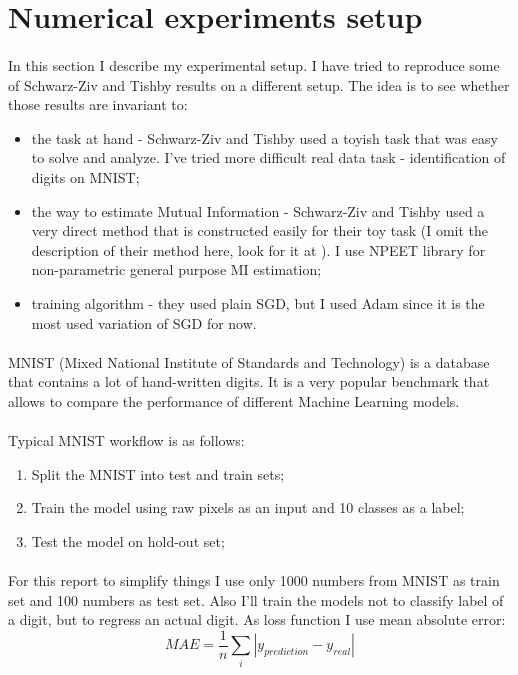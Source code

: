 \documentclass[a4paper,14pt]{extarticle}
\begin{document}
\section{Numerical experiments setup}
\paragraph{}
In this section I describe my experimental setup. I have tried to reproduce some of Schwarz-Ziv and Tishby results on a different setup. The idea is to see whether those results are invariant to:
\begin{itemize}
	\item the task at hand - Schwarz-Ziv and Tishby used a toyish task that was easy to solve and analyze. I've tried more difficult real data task - identification of digits on MNIST\cite{lecun1998mnist};
	\item the way to estimate Mutual Information - Schwarz-Ziv and Tishby used a very direct method that is constructed easily for their toy task (I omit the description of their method here, look for it at \cite{shwartz2017opening}). I use NPEET library\cite{ver2000non} for non-parametric general purpose MI estimation;
	\item training algorithm - they used plain SGD, but I used Adam\cite{kingma2014adam} since it is the most used variation of SGD for now.
\end{itemize}
\paragraph{}
MNIST (Mixed National Institute of Standards and Technology) is a database that contains a lot of hand-written digits. It is a very popular benchmark that allows to compare the performance of different Machine Learning models.
\paragraph{}
Typical MNIST workflow is as follows:
\begin{enumerate}
	\item Split the MNIST into test and train sets;
	\item Train the model using raw pixels as an input and 10 classes as a label;
	\item Test the model on hold-out set;
\end{enumerate}
\paragraph{}
For this report to simplify things I use only 1000 numbers from MNIST as train set and 100 numbers as test set. Also I'll train the models not to classify label of a digit, but to regress an actual digit. As loss function I use mean absolute error:
\begin{equation}
	MAE = \frac{1}{n}\sum_{i}|y_{prediction} - y_{real}|
\end{equation}
\end{document}
